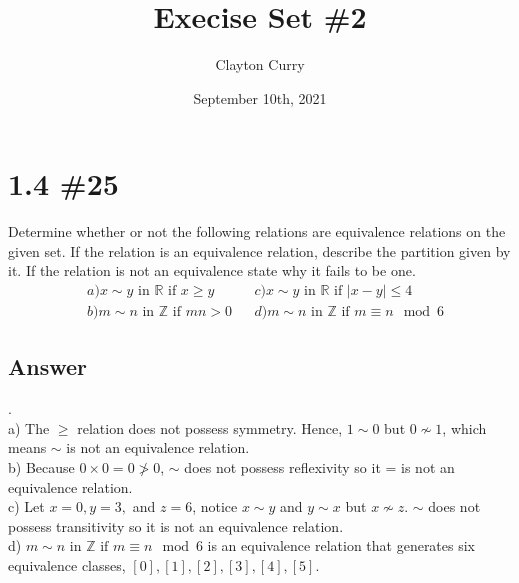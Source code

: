 \documentclass[
	12pt, %
]{fphw}
\title{Execise Set \#2} %
\author{Clayton Curry} %
\date{September 10th, 2021} %
\institute{University of Oklahoma \\ Department of Mathematics} %
\newcommand\R{\mathbb{R}}
\newcommand\Z{\mathbb{Z}}
\begin{document}
\maketitle %


\section*{1.4 \#25}

\begin{problem}
Determine whether or not the following relations are equivalence
relations on the given set. If the relation is an equivalence relation,
describe the partition given by it. If the relation is not an equivalence state why it fails to be one.
\begin{align*}
&a) x \sim y \text{ in } \R{} \text{ if } x \ge y &&c) x \sim y \text{ in } \R{} \text{ if } |x - y| \le 4\\
&b) m \sim n \text{ in } \Z{} \text{ if } mn > 0 &&d) m \sim n \text{ in }  \Z{} \text{ if } m \equiv n \mod 6
\end{align*}	

\end{problem}


\subsection*{Answer} .\\
a) The $\ge$ relation does not possess symmetry. Hence, $1 \sim 0$ but $0 \not \sim 1$, which means $\sim$ is not an equivalence relation.\\
b) Because $0 \times 0 = 0 \not > 0$, $\sim$ does not possess reflexivity so it = is not an equivalence relation.\\
c) Let $x = 0, y = 3,$ and $z = 6$, notice $x \sim y$ and $y \sim x$ but $x \not \sim z$.  $\sim$ does not possess transitivity so it is not an equivalence relation.\\
d) $m \sim n \text{ in }  \Z{} \text{ if } m \equiv n \mod 6$ is an equivalence relation that generates six equivalence classes, $[0], [1], [2], [3], [4], [5]$.
\end{document}
